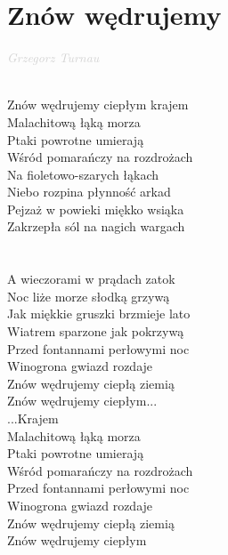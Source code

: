 \documentclass[a5paper, 10pt]{book}
\begin{document}
\section{Znów wędrujemy}\textcolor{lightgray}{\textit{Grzegorz Turnau}}\\~\\
\begin{minipage}[t]{0.8\textwidth}
Znów wędrujemy ciepłym krajem\\
Malachitową łąką morza\\
Ptaki powrotne umierają\\
Wśród pomarańczy na rozdrożach\\
\hspace*{4mm}Na fioletowo-szarych łąkach\\
\hspace*{4mm}Niebo rozpina płynność arkad\\
\hspace*{4mm}Pejzaż w powieki miękko wsiąka\\
\hspace*{4mm}Zakrzepła sól na nagich wargach\\
\\
\\
A wieczorami w prądach zatok\\
Noc liże morze słodką grzywą\\
Jak miękkie gruszki brzmieje lato\\
Wiatrem sparzone jak pokrzywą\\
\hspace*{4mm}Przed fontannami perłowymi noc\\
\hspace*{4mm}Winogrona gwiazd rozdaje\\
\hspace*{4mm}Znów wędrujemy ciepłą ziemią\\
\hspace*{4mm}Znów wędrujemy ciepłym...\\

...Krajem\\
Malachitową łąką morza\\
Ptaki powrotne umierają\\
Wśród pomarańczy na rozdrożach\\
\hspace*{4mm}Przed fontannami perłowymi noc\\
\hspace*{4mm}Winogrona gwiazd rozdaje\\
\hspace*{4mm}Znów wędrujemy ciepłą ziemią\\
\hspace*{4mm}Znów wędrujemy ciepłym\\
\end{minipage}
\end{document}
